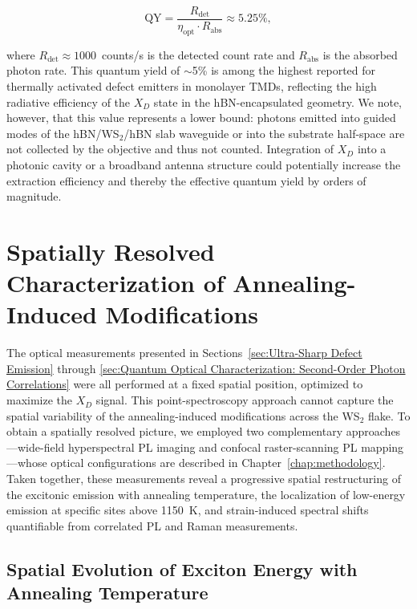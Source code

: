 \begin{equation}
\mathrm{QY} = \frac{R_{\mathrm{det}}}{\eta_{\mathrm{opt}} \cdot R_{\mathrm{abs}}} \approx 5.25\%,
\end{equation}

where $R_{\mathrm{det}} \approx 1000$~counts/s is the detected count rate and $R_{\mathrm{abs}}$ is the absorbed photon rate. This quantum yield of $\sim$5\% is among the highest reported for thermally activated defect emitters in monolayer TMDs, reflecting the high radiative efficiency of the $X_D$ state in the hBN-encapsulated geometry. We note, however, that this value represents a lower bound: photons emitted into guided modes of the hBN/WS$_2$/hBN slab waveguide or into the substrate half-space are not collected by the objective and thus not counted. Integration of $X_D$ into a photonic cavity or a broadband antenna structure could potentially increase the extraction efficiency and thereby the effective quantum yield by orders of magnitude.


\section{Spatially Resolved Characterization of Annealing-Induced Modifications}
\label{sec:Spatially Resolved Characterization}

The optical measurements presented in Sections~\ref{sec:Ultra-Sharp Defect Emission} through \ref{sec:Quantum Optical Characterization: Second-Order Photon Correlations} were all performed at a fixed spatial position, optimized to maximize the $X_D$ signal. This point-spectroscopy approach cannot capture the spatial variability of the annealing-induced modifications across the WS$_2$ flake. To obtain a spatially resolved picture, we employed two complementary approaches---wide-field hyperspectral PL imaging and confocal raster-scanning PL mapping---whose optical configurations are described in Chapter~\ref{chap:methodology}. Taken together, these measurements reveal a progressive spatial restructuring of the excitonic emission with annealing temperature, the localization of low-energy emission at specific sites above 1150~K, and strain-induced spectral shifts quantifiable from correlated PL and Raman measurements.

\subsection{Spatial Evolution of Exciton Energy with Annealing Temperature}
\label{subsec:Spatial Evolution of Exciton Energy with Annealing Temperature}

